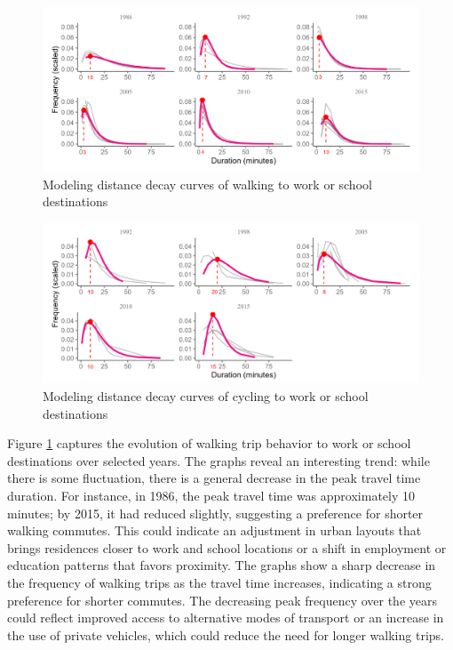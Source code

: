 \documentclass[
11pt, %
oneside, %
english, %
singlespacing, %
]{macthesis} %
\begin{document}
\begin{landscape}

\begin{figure}

{\centering \includegraphics[width=0.9\linewidth]{figure/ch03-Fig05} 

}

\caption{Modeling distance decay curves of walking to work or school destinations}\label{fig:work-wi}
\end{figure}


\begin{figure}

{\centering \includegraphics[width=0.9\linewidth]{figure/ch03-Fig06} 

}

\caption{Modeling distance decay curves of cycling to work or school destinations}\label{fig:work-ci}
\end{figure}
\end{landscape}

Figure \ref{fig:work-wi} captures the evolution of walking trip behavior to work or school destinations over selected years. The graphs reveal an interesting trend: while there is some fluctuation, there is a general decrease in the peak travel time duration. For instance, in 1986, the peak travel time was approximately 10 minutes; by 2015, it had reduced slightly, suggesting a preference for shorter walking commutes. This could indicate an adjustment in urban layouts that brings residences closer to work and school locations or a shift in employment or education patterns that favors proximity. The graphs show a sharp decrease in the frequency of walking trips as the travel time increases, indicating a strong preference for shorter commutes. The decreasing peak frequency over the years could reflect improved access to alternative modes of transport or an increase in the use of private vehicles, which could reduce the need for longer walking trips.
\end{document}
